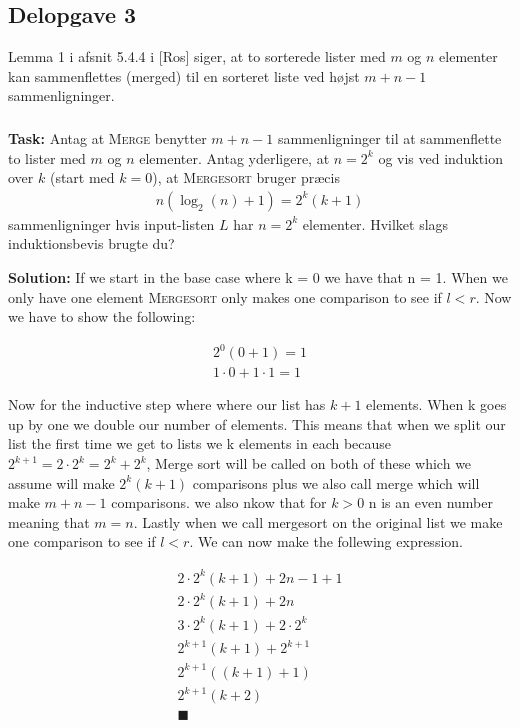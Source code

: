 \subsection{Delopgave 3}
Lemma 1 i afsnit 5.4.4 i [Ros] siger, at to sorterede lister med $m$ og $n$ elementer kan sammenflettes (merged) til en sorteret liste ved højst $m+n-1$ sammenligninger. 
\subsubsection{}
\textbf{Task:} Antag at \textsc{Merge} benytter $m+n-1$ sammenligninger til at sammenflette to lister med $m$ og $n$ elementer. Antag yderligere, at $n=2^k$ og vis ved induktion over $k$ (start med $k=0$), at \textsc{Mergesort} bruger præcis
	\begin{align*}
		n(\log_2(n)+1)=2^k(k+1)
	\end{align*}
sammenligninger hvis input-listen $L$ har $n=2^k$ elementer. Hvilket slags induktionsbevis brugte du?

\bigskip
\noindent
\textbf{Solution:} If we start in the base case where k = 0 we have that n = 1. When we only have one element \textsc{Mergesort} only makes one comparison to see if $l<r$. Now we have to show the following: 

\begin{equation}
    \begin{aligned}
        2^0(0+1)=1\\
        1\cdot0+1\cdot1=1
    \end{aligned}
\end{equation}

\noindent
Now for the inductive step where where our list has $k+1$ elements. When k goes up by one we double our number of elements. This means that when we split our list the first time we get to lists we k elements in each because $2^{k+1}=2\cdot2^k=2^k+2^k$, Merge sort will be called on both of these which we assume will make $2^k(k+1)$ comparisons plus we also call merge which will make $m+n-1$ comparisons. we also nkow that for $k>0$ n is an even number meaning that $m=n$. Lastly when we call mergesort on the original list we make one comparison to see if $l<r$. We can now make the follewing expression.

\begin{equation}
    \begin{aligned}
        2\cdot2^k(k+1)+2n-1+1\\
        2\cdot2^k(k+1)+2n\\
        3\cdot2^k(k+1)+2\cdot2^k\\
        2^{k+1}(k+1)+2^{k+1}\\
        2^{k+1}((k+1)+1)\\
        2^{k+1}(k+2)\\
        \blacksquare
    \end{aligned}
\end{equation}

